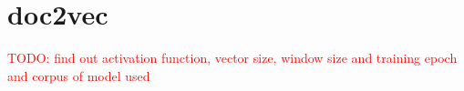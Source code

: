 \section{\ac{doc2vec}}\label{sec:impl-doc2vec}

\textcolor{red}{TODO: find out activation function, vector size, window size and training epoch and corpus of model used}